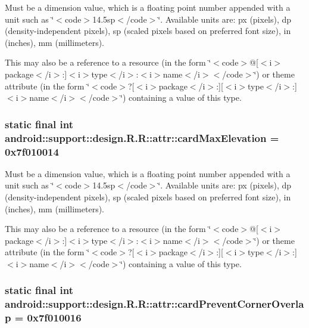 Must be a dimension value, which is a floating point number appended with a unit such as \char`\"{}$<$code$>$14.5sp$<$/code$>$\char`\"{}. Available units are: px (pixels), dp (density-independent pixels), sp (scaled pixels based on preferred font size), in (inches), mm (millimeters). 

This may also be a reference to a resource (in the form \char`\"{}$<$code$>$@\mbox{[}$<$i$>$package$<$/i$>$:\mbox{]}$<$i$>$type$<$/i$>$:$<$i$>$name$<$/i$>$$<$/code$>$\char`\"{}) or theme attribute (in the form \char`\"{}$<$code$>$?\mbox{[}$<$i$>$package$<$/i$>$:\mbox{]}\mbox{[}$<$i$>$type$<$/i$>$:\mbox{]}$<$i$>$name$<$/i$>$$<$/code$>$\char`\"{}) containing a value of this type. \hypertarget{classandroid_1_1support_1_1design_1_1_r_1_1attr_bb2f3fe02110ee239b119b7a9db5ec52}{
\subsubsection[{cardMaxElevation}]{\setlength{\rightskip}{0pt plus 5cm}static final int android::support::design.R.R::attr::cardMaxElevation = 0x7f010014}}
\label{classandroid_1_1support_1_1design_1_1_r_1_1attr_bb2f3fe02110ee239b119b7a9db5ec52}


Must be a dimension value, which is a floating point number appended with a unit such as \char`\"{}$<$code$>$14.5sp$<$/code$>$\char`\"{}. Available units are: px (pixels), dp (density-independent pixels), sp (scaled pixels based on preferred font size), in (inches), mm (millimeters). 

This may also be a reference to a resource (in the form \char`\"{}$<$code$>$@\mbox{[}$<$i$>$package$<$/i$>$:\mbox{]}$<$i$>$type$<$/i$>$:$<$i$>$name$<$/i$>$$<$/code$>$\char`\"{}) or theme attribute (in the form \char`\"{}$<$code$>$?\mbox{[}$<$i$>$package$<$/i$>$:\mbox{]}\mbox{[}$<$i$>$type$<$/i$>$:\mbox{]}$<$i$>$name$<$/i$>$$<$/code$>$\char`\"{}) containing a value of this type. \hypertarget{classandroid_1_1support_1_1design_1_1_r_1_1attr_148421f1af36843883e4463ae3234997}{
\subsubsection[{cardPreventCornerOverlap}]{\setlength{\rightskip}{0pt plus 5cm}static final int android::support::design.R.R::attr::cardPreventCornerOverlap = 0x7f010016}}
\label{classandroid_1_1support_1_1design_1_1_r_1_1attr_148421f1af36843883e4463ae3234997}


